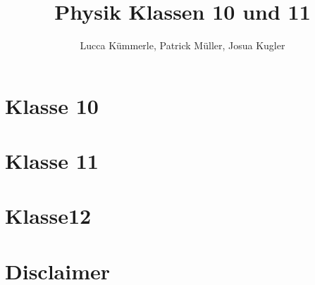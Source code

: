 \documentclass[oneside]{book}
\title{Physik Klassen 10 und 11}
\author{Lucca Kümmerle, Patrick Müller, Josua Kugler}
\numberwithin{equation}{section}
\begin{document}
\begin{flushleft}

	\maketitle
	\tableofcontents
	\chapter{Klasse 10}
	
	\chapter{Klasse 11}
	
	
	
	
	
	
	
	\chapter{Klasse12}
	
	\chapter*{Disclaimer}
	
\end{flushleft}
\end{document}
